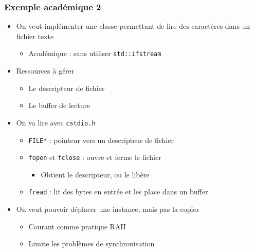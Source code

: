 \begin{frame}
\frametitle{Exemple académique 2}
\begin{itemize}[<+->]
\item On veut implémenter une classe permettant de lire des caractères dans un fichier texte
	\begin{itemize}
	\item Académique : sans utiliser \texttt{std::ifstream}
	\end{itemize}
\item Ressources à gérer
	\begin{itemize}
	\item Le descripteur de fichier
	\item Le buffer de lecture
	\end{itemize}
\item On va lire avec \texttt{cstdio.h}
	\begin{itemize}
	\item \texttt{FILE*} : pointeur vers un descripteur de fichier
	\item \texttt{fopen} et \texttt{fclose} : ouvre et ferme le fichier
		\begin{itemize}
		\item Obtient le descripteur, ou le libère
		\end{itemize}
	\item \texttt{fread} : lit des bytes en entrée et les place dans un buffer
	\end{itemize}
\item On veut pouvoir déplacer une instance, mais pas la copier
	\begin{itemize}
	\item Courant comme pratique RAII
	\item Limite les problèmes de synchronisation
	\end{itemize}
\end{itemize}
\end{frame}

